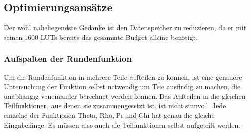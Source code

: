 \subsection{Optimierungsansätze}
Der wohl naheliegendste Gedanke ist den Datenspeicher zu reduzieren, da er mit seinen 1600 LUTs bereits das gesammte Budget alleine benötigt.

\subsubsection{Aufspalten der Rundenfunktion}
Um die Rundenfunktion in mehrere Teile aufteilen zu können, ist eine genauere Untersuchung der Funktion selbst notwendig um Teie ausfindig zu machen,
die unabhängig voneinander berechnet werden können. Das Aufteilen in die gleichen Teilfunktionen, aus denen sie zusammengesetzt ist, ist nicht sinnvoll.
Jede einzelne der Funktionen Theta, Rho, Pi und Chi hat genau die gleiche Eingabelänge. Es müssen also auch die Teilfunktionen selbst aufgeteilt werden.

